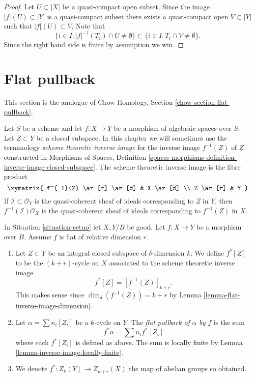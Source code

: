 \begin{proof}
Let $U \subset |X|$ be a quasi-compact open subset.
Since the image $|f|(U) \subset |Y|$ is a quasi-compact subset
there exists a quasi-compact open $V \subset |Y|$ such that
$|f|(U) \subset V$. Note that
$$
\{i \in I : |f|^{-1}(T_i) \cap U \not = \emptyset \}
\subset
\{i \in I : T_i \cap V \not = \emptyset \}.
$$
Since the right hand side is finite by assumption we win.
\end{proof}

















\section{Flat pullback}
\label{section-flat-pullback}

\noindent
This section is the analogue of
Chow Homology, Section \ref{chow-section-flat-pullback}.

\medskip\noindent
Let $S$ be a scheme and let $f : X \to Y$ be a morphism of algebraic
spaces over $S$. Let $Z \subset Y$ be a closed subspace.
In this chapter we will sometimes use the terminology
{\it scheme theoretic inverse image} for the inverse image
$f^{-1}(Z)$ of $Z$ constructed in Morphisms of Spaces, Definition
\ref{spaces-morphisms-definition-inverse-image-closed-subspace}.
The scheme theoretic inverse image is the fibre product
$$
\xymatrix{
f^{-1}(Z) \ar[r] \ar[d] & X \ar[d] \\
Z \ar[r] & Y
}
$$
If $\mathcal{I} \subset \mathcal{O}_Y$ is the quasi-coherent sheaf of ideals
corresponding to $Z$ in $Y$, then $f^{-1}(\mathcal{I})\mathcal{O}_X$ is the
quasi-coherent sheaf of ideals corresponding to $f^{-1}(Z)$ in $X$.

\begin{definition}
\label{definition-flat-pullback}
In Situation \ref{situation-setup} let $X, Y/B$ be good.
Let $f : X \to Y$ be a morphism over $B$.
Assume $f$ is flat of relative dimension $r$.
\begin{enumerate}
\item Let $Z \subset Y$ be an integral closed subspace of
$\delta$-dimension $k$. We define $f^*[Z]$ to be the
$(k+r)$-cycle on $X$ associated to the scheme theoretic inverse image
$$
f^*[Z] = [f^{-1}(Z)]_{k+r}.
$$
This makes sense since $\dim_\delta(f^{-1}(Z)) = k + r$
by Lemma \ref{lemma-flat-inverse-image-dimension}.
\item Let $\alpha = \sum n_i [Z_i]$ be
a $k$-cycle on $Y$. The {\it flat pullback of $\alpha$ by $f$}
is the sum
$$
f^* \alpha = \sum n_i f^*[Z_i]
$$
where each $f^*[Z_i]$ is defined as above.
The sum is locally finite by Lemma \ref{lemma-inverse-image-locally-finite}.
\item We denote $f^* : Z_k(Y) \to Z_{k + r}(X)$ the map of abelian
groups so obtained.
\end{enumerate}
\end{definition}

